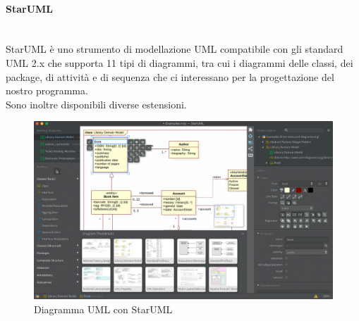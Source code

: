 		\paragraph{StarUML}
		\label{sec:StarUML}
		\mbox{}\\
		StarUML è uno strumento di modellazione UML compatibile con gli standard UML 2.x che supporta 11 tipi di diagrammi, tra cui i diagrammi delle classi, dei package, di attività e di sequenza che ci interessano per la progettazione del nostro programma.\\
		Sono inoltre disponibili diverse estensioni.
		\begin{figure}[h]
		\label{figuraStarUML}
		\centering 
		\includegraphics[width=1\textwidth]{images/starUML.png}
		\caption{Diagramma UML con StarUML} %
		\end{figure}

		
